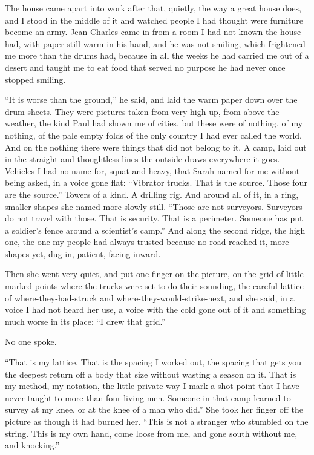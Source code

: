 The house came apart into work after that, quietly, the way a great house does, and I stood in the middle of it and watched people I had thought were furniture become an army. Jean-Charles came in from a room I had not known the house had, with paper still warm in his hand, and he was not smiling, which frightened me more than the drums had, because in all the weeks he had carried me out of a desert and taught me to eat food that served no purpose he had never once stopped smiling.\par

``It is worse than the ground,'' he said, and laid the warm paper down over the drum-sheets. They were pictures taken from very high up, from above the weather, the kind Paul had shown me of cities, but these were of nothing, of my nothing, of the pale empty folds of the only country I had ever called the world. And on the nothing there were things that did not belong to it. A camp, laid out in the straight and thoughtless lines the outside draws everywhere it goes. Vehicles I had no name for, squat and heavy, that Sarah named for me without being asked, in a voice gone flat: ``Vibrator trucks. That is the source. Those four are the source.'' Towers of a kind. A drilling rig. And around all of it, in a ring, smaller shapes she named more slowly still. ``Those are not surveyors. Surveyors do not travel with those. That is security. That is a perimeter. Someone has put a soldier's fence around a scientist's camp.'' And along the second ridge, the high one, the one my people had always trusted because no road reached it, more shapes yet, dug in, patient, facing inward.\par

Then she went very quiet, and put one finger on the picture, on the grid of little marked points where the trucks were set to do their sounding, the careful lattice of where-they-had-struck and where-they-would-strike-next, and she said, in a voice I had not heard her use, a voice with the cold gone out of it and something much worse in its place: ``I drew that grid.''\par

No one spoke.\par

``That is my lattice. That is the spacing I worked out, the spacing that gets you the deepest return off a body that size without wasting a season on it. That is my method, my notation, the little private way I mark a shot-point that I have never taught to more than four living men. Someone in that camp learned to survey at my knee, or at the knee of a man who did.'' She took her finger off the picture as though it had burned her. ``This is not a stranger who stumbled on the string. This is my own hand, come loose from me, and gone south without me, and knocking.''\par

